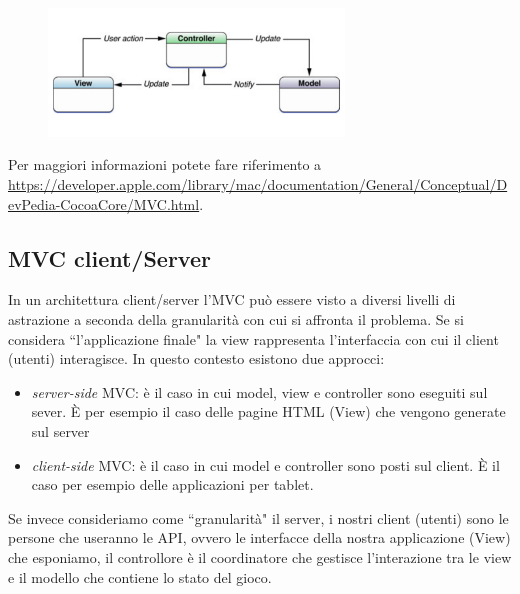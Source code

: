 \documentclass{article}
\begin{document}
\begin{figure}[h]
\centering
\includegraphics[width=0.7\textwidth]{Img/MVCCocoa.pdf}
\end{figure}

Per maggiori informazioni potete fare riferimento a \url{https://developer.apple.com/library/mac/documentation/General/Conceptual/DevPedia-CocoaCore/MVC.html}.

\subsection{MVC client/Server}
In un architettura client/server l'MVC pu\`o essere visto a diversi livelli di astrazione a seconda della granularit\`a con cui si affronta il problema. Se si considera ``l'applicazione finale" la view rappresenta l'interfaccia con cui il client (utenti) interagisce. In questo contesto esistono due approcci:
\begin{itemize}
\item \emph{server-side} MVC: \`e il caso in cui model, view e controller sono eseguiti sul sever. \`E per esempio il caso delle pagine HTML (View)
che vengono generate sul server
\item \emph{client-side} MVC: \`e il caso in cui model e controller sono posti sul client. \`E il caso per esempio delle applicazioni per tablet.
\end{itemize}

Se invece consideriamo come ``granularit\`a" il server, i nostri client (utenti) sono le persone che useranno le API, ovvero le interfacce della nostra applicazione (View) che esponiamo, il controllore \`e il coordinatore che gestisce l'interazione tra le view e il modello che contiene lo stato del gioco. 
\end{document}
